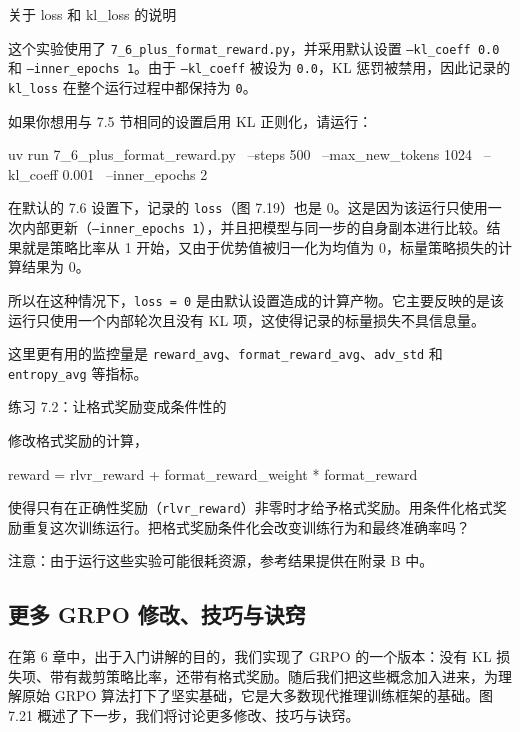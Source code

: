 \begin{mySidebar}{关于 loss 和 kl\_loss 的说明}

这个实验使用了 \texttt{7\_6\_plus\_format\_reward.py}，并采用默认设置 \texttt{--kl\_coeff 0.0} 和 \texttt{--inner\_epochs 1}。由于 \texttt{--kl\_coeff} 被设为 \texttt{0.0}，KL 惩罚被禁用，因此记录的 \texttt{kl\_loss} 在整个运行过程中都保持为 \texttt{0}。

如果你想用与 7.5 节相同的设置启用 KL 正则化，请运行：

\begin{codebox}
uv run 7_6_plus_format_reward.py \
    --steps 500 \
    --max_new_tokens 1024 \
    --kl_coeff 0.001 \
    --inner_epochs 2
\end{codebox}

在默认的 7.6 设置下，记录的 \texttt{loss}（图 7.19）也是 0。这是因为该运行只使用一次内部更新（\texttt{--inner\_epochs 1}），并且把模型与同一步的自身副本进行比较。结果就是策略比率从 1 开始，又由于优势值被归一化为均值为 0，标量策略损失的计算结果为 0。

所以在这种情况下，\texttt{loss = 0} 是由默认设置造成的计算产物。它主要反映的是该运行只使用一个内部轮次且没有 KL 项，这使得记录的标量损失不具信息量。

这里更有用的监控量是 \texttt{reward\_avg}、\texttt{format\_reward\_avg}、\texttt{adv\_std} 和 \texttt{entropy\_avg} 等指标。

\end{mySidebar}

\begin{mySidebar}{练习 7.2：让格式奖励变成条件性的}

修改格式奖励的计算，

\begin{codebox}
reward = rlvr_reward + format_reward_weight * format_reward
\end{codebox}

使得只有在正确性奖励（\texttt{rlvr\_reward}）非零时才给予格式奖励。用条件化格式奖励重复这次训练运行。把格式奖励条件化会改变训练行为和最终准确率吗？

注意：由于运行这些实验可能很耗资源，参考结果提供在附录 B 中。

\end{mySidebar}

\subsection{更多 GRPO 修改、技巧与诀窍}

在第 6 章中，出于入门讲解的目的，我们实现了 GRPO 的一个版本：没有 KL 损失项、带有裁剪策略比率，还带有格式奖励。随后我们把这些概念加入进来，为理解原始 GRPO 算法打下了坚实基础，它是大多数现代推理训练框架的基础。图 7.21 概述了下一步，我们将讨论更多修改、技巧与诀窍。


